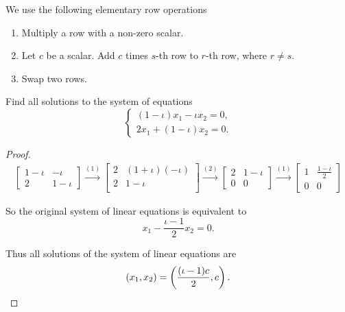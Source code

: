 We use the following elementary row operations
\begin{enumerate}[label={(\arabic*)\ =}]
    \item Multiply a row with a non-zero scalar.
    \item Let $c$ be a scalar. Add $c$ times $s$-th row to $r$-th row, where $r\ne s$.
    \item Swap two rows.
\end{enumerate}

\begin{exercise}
    Find all solutions to the system of equations
    \[
        \begin{cases}
            (1 - \iota)x_{1} - \iota x_{2} = 0, \\
            2x_{1} + (1 - \iota) x_{2} = 0.
        \end{cases}
    \]
\end{exercise}

\begin{proof}
    \begingroup{}
    \allowdisplaybreaks{}
    \begin{align*}
        \begin{bmatrix}
            1 - \iota & -\iota    \\
            2         & 1 - \iota
        \end{bmatrix}
        \stackrel{(1)}{\rightarrow}
        \begin{bmatrix}
            2 & (1 + \iota)(-\iota) \\
            2 & 1 - \iota           \\
        \end{bmatrix}
        \stackrel{(2)}{\rightarrow}
        \begin{bmatrix}
            2 & 1 - \iota \\
            0 & 0
        \end{bmatrix}
        \stackrel{(1)}{\rightarrow}
        \begin{bmatrix}
            1 & \frac{1 - \iota}{2} \\
            0 & 0
        \end{bmatrix}
    \end{align*}
    \endgroup{}

    So the original system of linear equations is equivalent to
    \[
        x_{1} - \frac{\iota - 1}{2}x_{2} = 0.
    \]

    Thus all solutions of the system of linear equations are
    \[
        (x_{1}, x_{2}) = \left( \frac{(\iota - 1)c}{2}, c \right).\qedhere
    \]
\end{proof}

